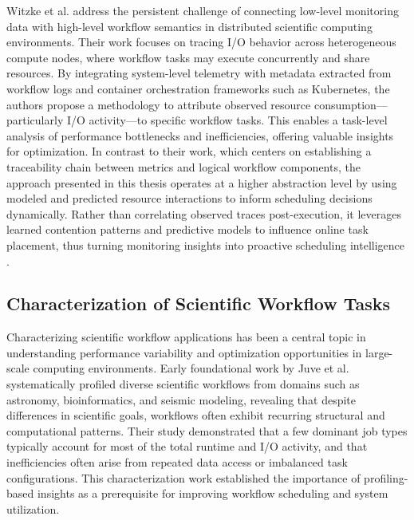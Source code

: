 Witzke et al. address the persistent challenge of connecting low-level monitoring data with high-level workflow semantics in distributed scientific computing environments. Their work focuses on tracing I/O behavior across heterogeneous compute nodes, where workflow tasks may execute concurrently and share resources. By integrating system-level telemetry with metadata extracted from workflow logs and container orchestration frameworks such as Kubernetes, the authors propose a methodology to attribute observed resource consumption—particularly I/O activity—to specific workflow tasks. This enables a task-level analysis of performance bottlenecks and inefficiencies, offering valuable insights for optimization. In contrast to their work, which centers on establishing a traceability chain between metrics and logical workflow components, the approach presented in this thesis operates at a higher abstraction level by using modeled and predicted resource interactions to inform scheduling decisions dynamically. Rather than correlating observed traces post-execution, it leverages learned contention patterns and predictive models to influence online task placement, thus turning monitoring insights into proactive scheduling intelligence \cite{Witzke2024}.

\subsection{Characterization of Scientific Workflow Tasks}
\label{sec:relatedwork_characterization_scientific_workflow_tasks}
Characterizing scientific workflow applications has been a central topic in understanding performance variability and optimization opportunities in large-scale computing environments. Early foundational work by Juve et al. systematically profiled diverse scientific workflows from domains such as astronomy, bioinformatics, and seismic modeling, revealing that despite differences in scientific goals, workflows often exhibit recurring structural and computational patterns. Their study demonstrated that a few dominant job types typically account for most of the total runtime and I/O activity, and that inefficiencies often arise from repeated data access or imbalanced task configurations. This characterization work established the importance of profiling-based insights as a prerequisite for improving workflow scheduling and system utilization.

